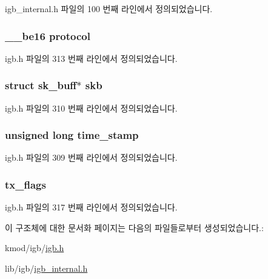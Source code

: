 igb\+\_\+internal.\+h 파일의 100 번째 라인에서 정의되었습니다.

\subsubsection[{\texorpdfstring{protocol}{protocol}}]{\setlength{\rightskip}{0pt plus 5cm}\+\_\+\+\_\+be16 protocol}\hypertarget{structigb__tx__buffer_ae6852c5fea84edd47e3d3ce930c41cf1}{}\label{structigb__tx__buffer_ae6852c5fea84edd47e3d3ce930c41cf1}


igb.\+h 파일의 313 번째 라인에서 정의되었습니다.

\subsubsection[{\texorpdfstring{skb}{skb}}]{\setlength{\rightskip}{0pt plus 5cm}struct sk\+\_\+buff$\ast$ skb}\hypertarget{structigb__tx__buffer_aeba6836824708325a83121030f092c30}{}\label{structigb__tx__buffer_aeba6836824708325a83121030f092c30}


igb.\+h 파일의 310 번째 라인에서 정의되었습니다.

\subsubsection[{\texorpdfstring{time\+\_\+stamp}{time_stamp}}]{\setlength{\rightskip}{0pt plus 5cm}unsigned long time\+\_\+stamp}\hypertarget{structigb__tx__buffer_a5d390b40ee7866a00e496883fb21fb15}{}\label{structigb__tx__buffer_a5d390b40ee7866a00e496883fb21fb15}


igb.\+h 파일의 309 번째 라인에서 정의되었습니다.

\subsubsection[{\texorpdfstring{tx\+\_\+flags}{tx_flags}}]{ tx\+\_\+flags}\hypertarget{structigb__tx__buffer_a428012b2ca384e2898d6389025a7b6db}{}\label{structigb__tx__buffer_a428012b2ca384e2898d6389025a7b6db}


igb.\+h 파일의 317 번째 라인에서 정의되었습니다.



이 구조체에 대한 문서화 페이지는 다음의 파일들로부터 생성되었습니다.\+:\begin{DoxyCompactItemize}
\item 
kmod/igb/\hyperlink{kmod_2igb_2igb_8h}{igb.\+h}\item 
lib/igb/\hyperlink{igb__internal_8h}{igb\+\_\+internal.\+h}\end{DoxyCompactItemize}
